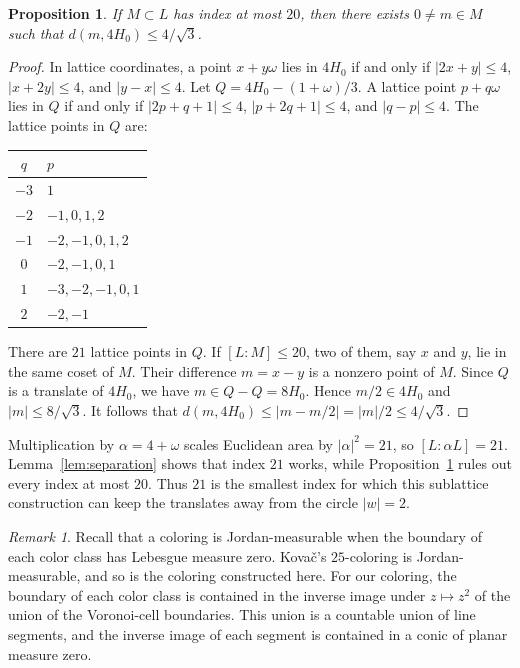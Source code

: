 \documentclass[12pt,reqno]{amsart}
\newtheorem{proposition}[lemma]{Proposition}
\theoremstyle{remark}
\newtheorem{remark}{Remark}
\theoremstyle{definition}
\numberwithin{equation}{section}
\begin{document}
\begin{proposition}\label{prop:sharp}
If $M\subset L$ has index at most $20$, then there exists $0\ne m\in M$ such that $d(m,4H_0)\le4/\sqrt3$.
\end{proposition}

\begin{proof}
In lattice coordinates, a point $x+y\omega$ lies in $4H_0$ if and only if $|2x+y|\le4$, $|x+2y|\le4$, and $|y-x|\le4$. Let $Q=4H_0-(1+\omega)/3$. A lattice point $p+q\omega$ lies in $Q$ if and only if $|2p+q+1|\le4$, $|p+2q+1|\le4$, and $|q-p|\le4$.
The lattice points in $Q$ are:

\begin{center}
\begin{tabular}{c|l}
$q$ & $p$ \\ \hline
$-3$ & $1$ \\
$-2$ & $-1,0,1,2$ \\
$-1$ & $-2,-1,0,1,2$ \\
$0$ & $-2,-1,0,1$ \\
$1$ & $-3,-2,-1,0,1$ \\
$2$ & $-2,-1$
\end{tabular}
\end{center}

There are $21$ lattice points in $Q$. If $[L:M]\le20$, two of them, say $x$ and $y$, lie in the same coset of $M$. Their difference $m=x-y$ is a nonzero point of $M$. Since $Q$ is a translate of $4H_0$, we have $m\in Q-Q=8H_0$. Hence $m/2\in4H_0$ and $|m|\le8/\sqrt3$. It follows that $d(m,4H_0)\le|m-m/2|=|m|/2\le4/\sqrt3$.
\end{proof}

Multiplication by $\alpha=4+\omega$ scales Euclidean area by $|\alpha|^2=21$, so $[L:\alpha L]=21$. Lemma~\ref{lem:separation} shows that index $21$ works, while Proposition~\ref{prop:sharp} rules out every index at most $20$. Thus $21$ is the smallest index for which this sublattice construction can keep the translates away from the circle $|w|=2$.

\begin{remark}
  Recall that a coloring is Jordan-measurable when the boundary of each color class has Lebesgue measure zero. Kova\v{c}'s $25$-coloring is Jordan-measurable, and so is the coloring constructed here. For our coloring, the boundary of each color class is contained in the inverse image under $z\mapsto z^2$ of the union of the Voronoi-cell boundaries. This union is a countable union of line segments, and the inverse image of each segment is contained in a conic of planar measure zero.
\end{remark}
\end{document}
